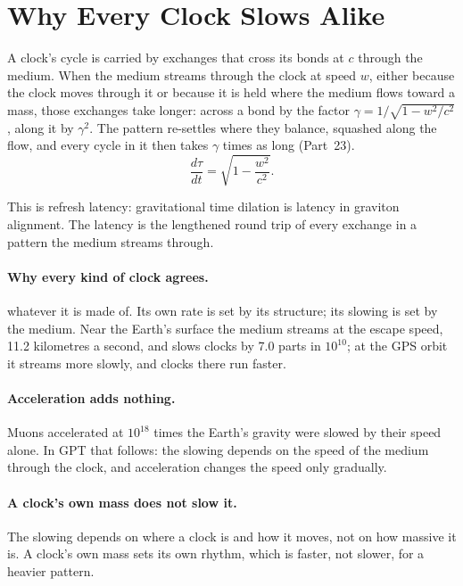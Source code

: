 \documentclass[11pt,a4paper]{article}
\begin{document}
\section{Why Every Clock Slows Alike}
\label{sec:slowing}

\begin{hypbar}
A clock's cycle is carried by exchanges that cross its bonds at $c$ through the medium. When the medium streams through the clock at speed $w$, either because the clock moves through it or because it is held where the medium flows toward a mass, those exchanges take longer: across a bond by the factor $\gamma = 1/\sqrt{1-w^2/c^2}$, along it by $\gamma^2$. The pattern re-settles where they balance, squashed along the flow, and every cycle in it then takes $\gamma$ times as long (Part~23).
\begin{equation}
\frac{d\tau}{dt} = \sqrt{1 - \frac{w^2}{c^2}} .
\label{eq:clock}
\end{equation}
\end{hypbar}

This is refresh latency: gravitational time dilation is latency in graviton alignment. The latency is the lengthened round trip of every exchange in a pattern the medium streams through.

\paragraph{Why every kind of clock agrees.}  whatever it is made of. Its own rate is set by its structure; its slowing is set by the medium. Near the Earth's surface the medium streams at the escape speed, 11.2 kilometres a second, and slows clocks by 7.0 parts in $10^{10}$; at the GPS orbit it streams more slowly, and clocks there run faster.

\paragraph{Acceleration adds nothing.} Muons accelerated at $10^{18}$ times the Earth's gravity were slowed by their speed alone. In GPT that follows: the slowing depends on the speed of the medium through the clock, and acceleration changes the speed only gradually.

\paragraph{A clock's own mass does not slow it.} The slowing depends on where a clock is and how it moves, not on how massive it is. A clock's own mass sets its own rhythm, which is faster, not slower, for a heavier pattern.
\end{document}
